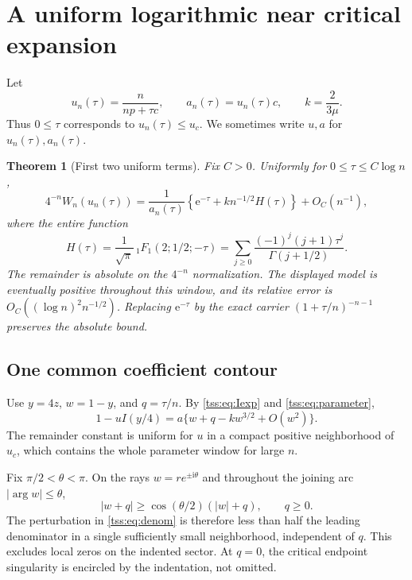 \documentclass[11pt]{article}
\newtheorem{theorem}{Theorem}[section]
\theoremstyle{remark}\newtheorem{remark}[theorem]{Remark}
\theoremstyle{definition}\newtheorem{definition}[theorem]{Definition}
\newcommand{\ii}{\mathrm i}
\newcommand{\e}{\mathrm e}
\begin{document}
\section{A uniform logarithmic near critical expansion}
\label{tss:sec:uniform}
Let
\begin{equation}\label{tss:eq:parameter}
u_n(\tau)=\frac{n}{np+\tau c},\qquad
 a_n(\tau)=u_n(\tau)c,\qquad k=\frac2{3\mu}.
\end{equation}
Thus $0\leq\tau$ corresponds to $u_n(\tau)\leq u_c$. We sometimes write $u,a$ for $u_n(\tau),a_n(\tau)$.

\begin{theorem}[First two uniform terms]\label{tss:thm:uniform}
Fix $C>0$. Uniformly for $0\leq\tau\leq C\log n$,
\begin{equation}\label{tss:eq:uniform}
4^{-n}W_n(u_n(\tau))
 =\frac1{a_n(\tau)}\left\{\e^{-\tau}
        +k n^{-1/2}H(\tau)\right\}+O_C(n^{-1}),
\end{equation}
where the entire function
\begin{equation}\label{tss:eq:H}
H(\tau)=\frac1{\sqrt\pi}\,{}_1F_1(2;1/2;-\tau)
 =\sum_{j\geq0}\frac{(-1)^j(j+1)\tau^j}{\Gamma(j+1/2)}.
\end{equation}
The remainder is absolute on the $4^{-n}$ normalization. The displayed model is eventually positive throughout this window, and its relative error is
$O_C((\log n)^2n^{-1/2})$. Replacing $\e^{-\tau}$ by the exact carrier
$(1+\tau/n)^{-n-1}$ preserves the absolute bound.
\end{theorem}

\subsection{One common coefficient contour}
\label{tss:sec:contour}
Use $y=4z$, $w=1-y$, and $q=\tau/n$. By \eqref{tss:eq:Iexp} and \eqref{tss:eq:parameter},
\begin{equation}\label{tss:eq:denom}
1-uI(y/4)=a\{w+q-kw^{3/2}+O(w^2)\}.
\end{equation}
The remainder constant is uniform for $u$ in a compact positive neighborhood of $u_c$, which contains the whole parameter window for large $n$.

Fix $\pi/2<\theta<\pi$. On the rays $w=re^{\pm\ii\theta}$ and throughout the joining arc $|\arg w|\leq\theta$,
\begin{equation}\label{tss:eq:lower}
|w+q|\geq\cos(\theta/2)(|w|+q),\qquad q\geq0.
\end{equation}
The perturbation in \eqref{tss:eq:denom} is therefore less than half the leading denominator in a single sufficiently small neighborhood, independent of $q$. This excludes local zeros on the indented sector. At $q=0$, the critical endpoint singularity is encircled by the indentation, not omitted.
\end{document}
